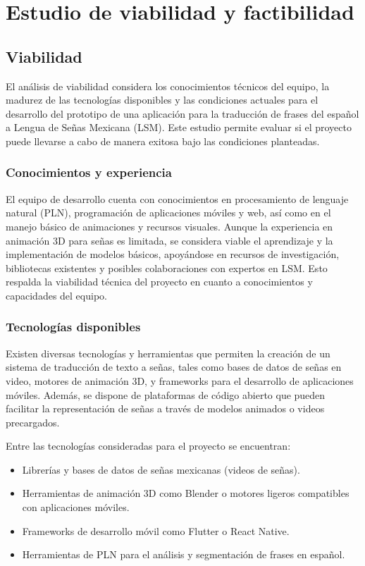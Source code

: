 \chapter{Estudio de viabilidad y factibilidad}
\section{Viabilidad}
El análisis de viabilidad considera los conocimientos técnicos del equipo, la madurez de las tecnologías disponibles y las condiciones actuales para el desarrollo del prototipo de una aplicación para la traducción de frases del español a Lengua de Señas Mexicana (LSM). Este estudio permite evaluar si el proyecto puede llevarse a cabo de manera exitosa bajo las condiciones planteadas.

\subsection{Conocimientos y experiencia}
El equipo de desarrollo cuenta con conocimientos en procesamiento de lenguaje natural (PLN), programación de aplicaciones móviles y web, así como en el manejo básico de animaciones y recursos visuales. Aunque la experiencia en animación 3D para señas es limitada, se considera viable el aprendizaje y la implementación de modelos básicos, apoyándose en recursos de investigación, bibliotecas existentes y posibles colaboraciones con expertos en LSM. Esto respalda la viabilidad técnica del proyecto en cuanto a conocimientos y capacidades del equipo.

\subsection{Tecnologías disponibles}
Existen diversas tecnologías y herramientas que permiten la creación de un sistema de traducción de texto a señas, tales como bases de datos de señas en video, motores de animación 3D, y frameworks para el desarrollo de aplicaciones móviles. Además, se dispone de plataformas de código abierto que pueden facilitar la representación de señas a través de modelos animados o videos precargados.

Entre las tecnologías consideradas para el proyecto se encuentran:
\begin{itemize}
	\item Librerías y bases de datos de señas mexicanas (videos de señas).
	\item Herramientas de animación 3D como Blender o motores ligeros compatibles con aplicaciones móviles.
	\item Frameworks de desarrollo móvil como Flutter o React Native.
	\item Herramientas de PLN para el análisis y segmentación de frases en español.
\end{itemize}

